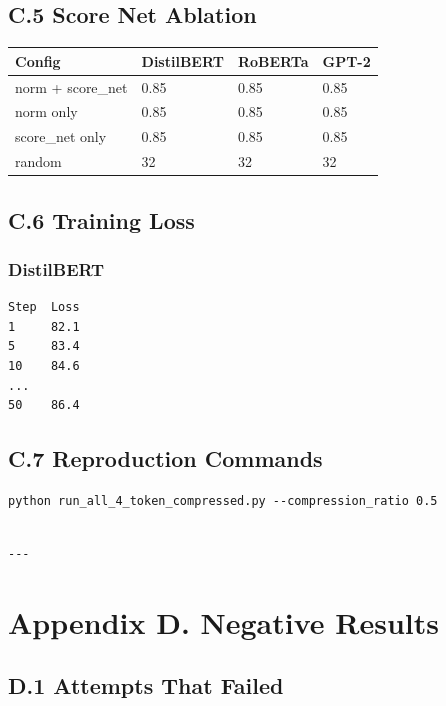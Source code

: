 \subsection{C.5 Score Net Ablation}

\begin{table}[H]
\centering
\small
\begin{tabular}{llll}
\toprule
\textbf{Config} & \textbf{DistilBERT} & \textbf{RoBERTa} & \textbf{GPT-2} \\
\midrule
norm + score\_net & 0.85 & 0.85 & 0.85 \\
norm only & 0.85 & 0.85 & 0.85 \\
score\_net only & 0.85 & 0.85 & 0.85 \\
random & 32 & 32 & 32 \\
\bottomrule
\end{tabular}
\end{table}

\subsection{C.6 Training Loss}

\subsubsection{DistilBERT}
\begin{lstlisting}
Step  Loss
1     82.1
5     83.4
10    84.6
...
50    86.4
\end{lstlisting}

\subsection{C.7 Reproduction Commands}

\begin{lstlisting}
python run_all_4_token_compressed.py --compression_ratio 0.5
\end{lstlisting}
\begin{lstlisting}

---
\end{lstlisting}

\section{Appendix D. Negative Results}

\subsection{D.1 Attempts That Failed}

